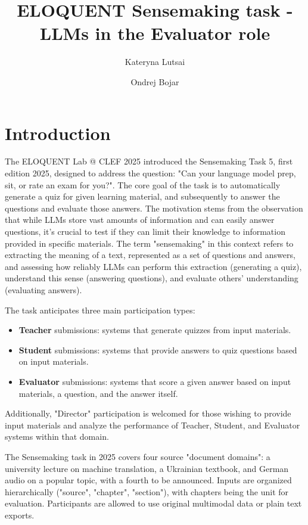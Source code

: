 \documentclass[fleqn,10pt]{olplainarticle}
\title{ELOQUENT Sensemaking task - LLMs in the Evaluator role}
\author[1]{Kateryna Lutsai}
\author[2]{Ondrej Bojar}
\affil[1]{CU, MFF}
\affil[2]{CU, UFAL}
\begin{document}
\flushbottom
\maketitle
\thispagestyle{empty}

\section*{Introduction}

The ELOQUENT Lab @ CLEF 2025 introduced the Sensemaking Task 5, first edition 2025, designed to address the question: "Can your language model prep, sit, or rate an exam for you?". The core goal of the task is to automatically generate a quiz for given learning material, and subsequently to answer the questions and evaluate those answers. The motivation stems from the observation that while LLMs store vast amounts of information and can easily answer questions, it's crucial to test if they can limit their knowledge to information provided in specific materials. The term "sensemaking" in this context refers to extracting the meaning of a text, represented as a set of questions and answers, and assessing how reliably LLMs can perform this extraction (generating a quiz), understand this sense (answering questions), and evaluate others' understanding (evaluating answers).

The task anticipates three main participation types:
\begin{itemize}
    \item \textbf{Teacher} submissions: systems that generate quizzes from input materials.
    \item \textbf{Student} submissions: systems that provide answers to quiz questions based on input materials.
    \item \textbf{Evaluator} submissions: systems that score a given answer based on input materials, a question, and the answer itself.
\end{itemize}
Additionally, "Director" participation is welcomed for those wishing to provide input materials and analyze the performance of Teacher, Student, and Evaluator systems within that domain.

The Sensemaking task in 2025 covers four source "document domains": a university lecture on machine translation, a Ukrainian textbook, and German audio on a popular topic, with a fourth to be announced. Inputs are organized hierarchically ("source", "chapter", "section"), with chapters being the unit for evaluation. Participants are allowed to use original multimodal data or plain text exports.
\end{document}
